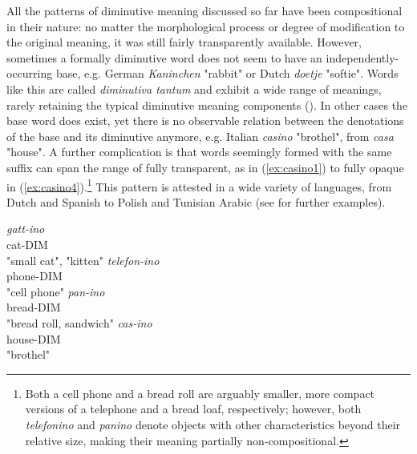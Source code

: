 All the patterns of diminutive meaning discussed so far have been compositional in their nature: no matter the morphological process or degree of modification to the original meaning, it was still fairly transparently available. However, sometimes a formally diminutive word does not seem to have an independently-occurring base, e.g. German \textit{Kaninchen} "rabbit" or Dutch \textit{doetje} "softie". Words like this are called \textit{diminutiva tantum} and exhibit a wide range of meanings, rarely retaining the typical diminutive meaning components (\cite{taalportaal}). In other cases the base word does exist, yet there is no observable relation between the denotations of the base and its diminutive anymore, e.g. Italian \textit{casino} "brothel", from \textit{casa} "house". A further complication is that words seemingly formed with the same suffix can span the range of fully transparent, as in (\ref{ex:casino1}) to fully opaque in (\ref{ex:casino4}).\footnote{Both a cell phone and a bread roll are arguably smaller, more compact versions of a telephone and a bread loaf, respectively; however, both \textit{telefonino} and \textit{panino} denote objects with other characteristics beyond their relative size, making their meaning partially non-compositional.} This pattern is attested in a wide variety of languages, from Dutch and Spanish to Polish and Tunisian Arabic (see \citeauthor{DeBelder+etal+2014} \citeyear{DeBelder+etal+2014} for further examples).
\begin{exe}
\ex \label{ex:casino} 
\begin{multicols}{2}
\begin{xlist}
\ex \label{ex:casino1} \gll
\textit{gatt-ino} \\
cat-DIM \\
\trans "small cat", "kitten"
\ex \label{ex:casino2} \gll
\textit{telefon-ino} \\
phone-DIM \\
\trans "cell phone"
\columnbreak
\ex \label{ex:casino3} \gll
\textit{pan-ino} \\
bread-DIM \\
\trans "bread roll, sandwich"
\ex \label{ex:casino4} \gll
\textit{cas-ino} \\
house-DIM \\
\trans "brothel"
\end{xlist}
\end{multicols}
\end{exe}

